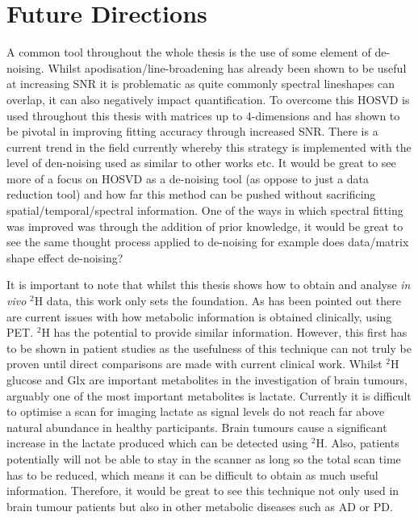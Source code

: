 \section{Future Directions}

A common tool throughout the whole thesis is the use of some element of de-noising. Whilst apodisation/line-broadening has already been shown to be useful at increasing \ac{SNR} it is problematic as quite commonly spectral lineshapes can overlap, it can also negatively impact quantification. To overcome this \ac{HOSVD} is used throughout this thesis with matrices up to 4-dimensions and has shown to be pivotal in improving fitting accuracy through increased \ac{SNR}. There is a current trend in the field currently whereby this strategy is implemented with the level of den-noising used as similar to other works etc. It would be great to see more of a focus on \ac{HOSVD} as a de-noising tool (as oppose to just a data reduction tool) and how far this method can be pushed without sacrificing spatial/temporal/spectral information. One of the ways in which spectral fitting was improved was through the addition of prior knowledge, it would be great to see the same thought process applied to de-noising for example does data/matrix shape effect de-noising?

It is important to note that whilst this thesis shows how to obtain and analyse \textit{in vivo} $^2$H data, this work only sets the foundation. As has been pointed out there are current issues with how metabolic information is obtained clinically, using \ac{PET}. $^2$H has the potential to provide similar information. However, this first has to be shown in patient studies as the usefulness of this technique can not truly be proven until direct comparisons are made with current clinical work. Whilst $^2$H glucose and Glx are important metabolites in the investigation of brain tumours, arguably one of the most important metabolites is lactate. Currently it is difficult to optimise a scan for imaging lactate as signal levels do not reach far above natural abundance in healthy participants. Brain tumours cause a significant increase in the lactate produced which can be detected using $^2$H. Also, patients potentially will not be able to stay in the scanner as long so the total scan time has to be reduced, which means it can be difficult to obtain as much useful information. Therefore, it would be great to see this technique not only used in brain tumour patients but also in other metabolic diseases such as \ac{AD} or \ac{PD}.

